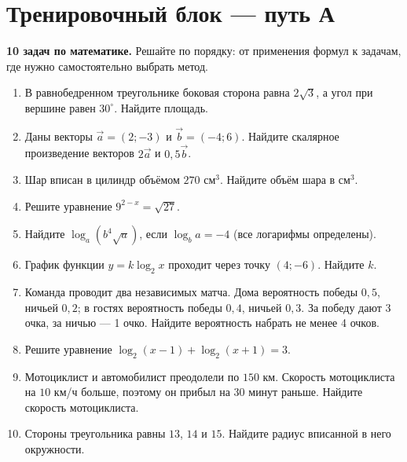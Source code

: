 \documentclass[a4paper,12pt]{article}
\begin{document}
\section*{\color{darkaccent}Тренировочный блок --- путь А}
\textbf{10 задач по математике.} Решайте по порядку: от применения формул к задачам, где нужно самостоятельно выбрать метод.
\begin{enumerate}[label=\textbf{\arabic*.}]
\item В равнобедренном треугольнике боковая сторона равна $2\sqrt3$, а угол при вершине равен $30^\circ$. Найдите площадь.
\item Даны векторы $\vec a=(2;-3)$ и $\vec b=(-4;6)$. Найдите скалярное произведение векторов $2\vec a$ и $0{,}5\vec b$.
\item Шар вписан в цилиндр объёмом $270$ см$^3$. Найдите объём шара в см$^3$.
\item Решите уравнение $9^{2-x}=\sqrt{27}$.
\item Найдите $\log_a(b^4\sqrt a)$, если $\log_b a=-4$ (все логарифмы определены).
\item График функции $y=k\log_2 x$ проходит через точку $(4;-6)$. Найдите $k$.
\item Команда проводит два независимых матча. Дома вероятность победы $0{,}5$, ничьей $0{,}2$; в гостях вероятность победы $0{,}4$, ничьей $0{,}3$. За победу дают 3 очка, за ничью --- 1 очко. Найдите вероятность набрать не менее 4 очков.
\item Решите уравнение $\log_2(x-1)+\log_2(x+1)=3$.
\item Мотоциклист и автомобилист преодолели по $150$ км. Скорость мотоциклиста на $10$ км/ч больше, поэтому он прибыл на $30$ минут раньше. Найдите скорость мотоциклиста.
\item Стороны треугольника равны $13$, $14$ и $15$. Найдите радиус вписанной в него окружности.
\end{enumerate}
\clearpage
\end{document}
